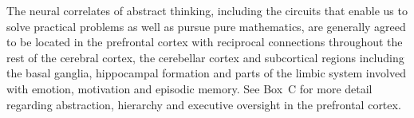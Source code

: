 \documentclass[letterpaper,11pt]{article}
\def\colorred#1{{\color{red}#1}}
\def\urlh#1{{}}
\begin{document}
The neural correlates of abstract thinking, including the circuits that enable us to solve practical problems as well as pursue pure mathematics, are generally agreed to be located in the prefrontal cortex with reciprocal connections throughout the rest of the cerebral cortex, the cerebellar cortex and subcortical regions including the basal ganglia, hippocampal formation and parts of the limbic system involved with emotion, motivation and episodic memory. See {\urlh{box_abstract}{Box~\colorred{C}}} for more detail regarding abstraction, hierarchy and executive oversight in the prefrontal cortex.



\end{document}
